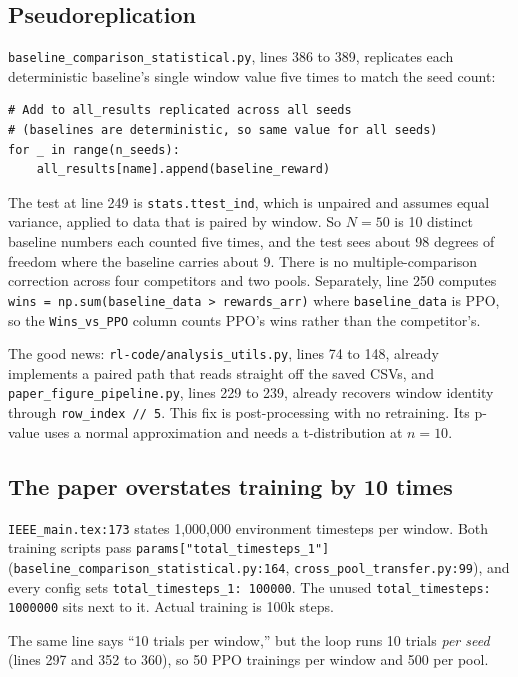 \documentclass[11pt,a4paper]{article}
\newcommand{\code}[1]{\texttt{\small #1}}
\begin{document}
\subsection{Pseudoreplication}

\code{baseline\_comparison\_statistical.py}, lines 386 to 389, replicates each deterministic baseline's
single window value five times to match the seed count:

\begin{lstlisting}
# Add to all_results replicated across all seeds
# (baselines are deterministic, so same value for all seeds)
for _ in range(n_seeds):
    all_results[name].append(baseline_reward)
\end{lstlisting}

The test at line 249 is \code{stats.ttest\_ind}, which is unpaired and assumes equal variance,
applied to data that is paired by window. So $N=50$ is 10 distinct baseline numbers each counted
five times, and the test sees about 98 degrees of freedom where the baseline carries about 9. There
is no multiple-comparison correction across four competitors and two pools. Separately, line 250
computes \code{wins = np.sum(baseline\_data > rewards\_arr)} where \code{baseline\_data} is PPO, so
the \code{Wins\_vs\_PPO} column counts PPO's wins rather than the competitor's.

The good news: \code{rl-code/analysis\_utils.py}, lines 74 to 148, already implements a paired path that
reads straight off the saved CSVs, and \code{paper\_figure\_pipeline.py}, lines 229 to 239, already recovers
window identity through \code{row\_index // 5}. This fix is post-processing with no retraining. Its
p-value uses a normal approximation and needs a t-distribution at $n=10$.

\subsection{The paper overstates training by 10 times}

\code{IEEE\_main.tex:173} states 1{,}000{,}000 environment timesteps per window. Both training
scripts pass \code{params["total\_timesteps\_1"]}
(\code{baseline\_comparison\_statistical.py:164}, \code{cross\_pool\_transfer.py:99}), and every
config sets \code{total\_timesteps\_1: 100000}. The unused \code{total\_timesteps: 1000000} sits
next to it. Actual training is 100k steps.

The same line says ``10 trials per window,'' but the loop runs 10 trials \emph{per seed} (lines 297
and 352 to 360), so 50 PPO trainings per window and 500 per pool.
\end{document}
